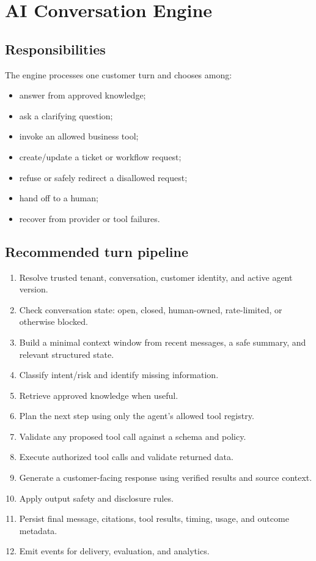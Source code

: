 \chapter{AI Conversation Engine}

\section{Responsibilities}

The engine processes one customer turn and chooses among:

\begin{itemize}
\item answer from approved knowledge;
\item ask a clarifying question;
\item invoke an allowed business tool;
\item create/update a ticket or workflow request;
\item refuse or safely redirect a disallowed request;
\item hand off to a human;
\item recover from provider or tool failures.
\end{itemize}
\section{Recommended turn pipeline}

\begin{enumerate}
\item Resolve trusted tenant, conversation, customer identity, and active agent version.
\item Check conversation state: open, closed, human-owned, rate-limited, or otherwise blocked.
\item Build a minimal context window from recent messages, a safe summary, and relevant structured state.
\item Classify intent/risk and identify missing information.
\item Retrieve approved knowledge when useful.
\item Plan the next step using only the agent's allowed tool registry.
\item Validate any proposed tool call against a schema and policy.
\item Execute authorized tool calls and validate returned data.
\item Generate a customer-facing response using verified results and source context.
\item Apply output safety and disclosure rules.
\item Persist final message, citations, tool results, timing, usage, and outcome metadata.
\item Emit events for delivery, evaluation, and analytics.
\end{enumerate}
